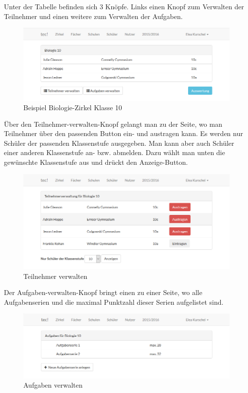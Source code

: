 Unter der Tabelle befinden sich 3 Knöpfe. Links einen Knopf zum Verwalten der Teilnehmer und einen weitere zum Verwalten der Aufgaben. 

\begin{figure}[ht]
	\centering
	\includegraphics[scale=.5]{bilder/Zirkel_Biologie.png}
	\caption{Beispiel Biologie-Zirkel Klasse 10}
	\label{abb:beispiel}
\end{figure}

Über den Teilnehmer-verwalten-Knopf gelangt man zu der Seite, wo man Teilnehmer über den passenden Button ein- und austragen kann. Es werden nur Schüler der passenden Klassenstufe ausgegeben. Man kann aber auch Schüler einer anderen Klassenstufe an- bzw. abmelden. Dazu wählt man unten die gewünschte Klassenstufe aus und drückt den Anzeige-Button. 

\begin{figure}[ht]
	\centering
	\includegraphics[scale=.5]{bilder/Teilnehmer_verwalten.png}
	\caption{Teilnehmer verwalten}
\end{figure}

\newpage
Der Aufgaben-verwalten-Knopf bringt einen zu einer Seite, wo alle Aufgabenserien und die maximal Punktzahl dieser Serien aufgelistet sind. 

\begin{figure}[ht]
	\centering
	\includegraphics[scale=.5]{bilder/Aufgaben_verwalten.png}
	\caption{Aufgaben verwalten}
\end{figure}

